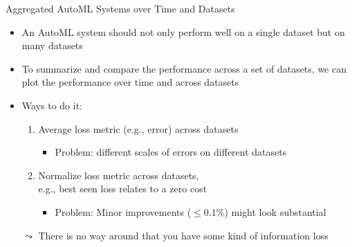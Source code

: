 \begin{frame}[c]{Aggregated AutoML Systems over Time and Datasets}

\begin{itemize}
	\item An AutoML system should not only perform well on a single dataset but on many datasets
	\item To summarize and compare the performance across a set of datasets,
	we can plot the performance over time and across datasets
	\pause
	\item Ways to do it:
	\begin{enumerate}
		\item Average loss metric (e.g., error) across datasets
		\begin{itemize}
			\item Problem: different scales of errors on different datasets
		\end{itemize}
	    \pause
	    \item Normalize loss metric across datasets,\\
	    e.g., best seen loss relates to a zero cost
	    \begin{itemize}
	    	\item Problem: Minor improvements ($\leq 0.1\%$) might look substantial
	    \end{itemize}
	\end{enumerate}
    \pause
    \item[$\leadsto$] There is no way around that you have some kind of information loss 
\end{itemize}

\end{frame}
